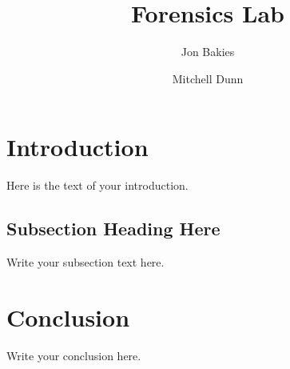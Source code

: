 \documentclass{article}
\begin{document}
\title{Forensics Lab}
\author{Jon Bakies} 
\author{Mitchell Dunn} 
\maketitle
\newpage

\tableofcontents
\newpage

\section{Introduction}
Here is the text of your introduction.

\subsection{Subsection Heading Here}
Write your subsection text here.

\section{Conclusion}
Write your conclusion here.
\end{document}
